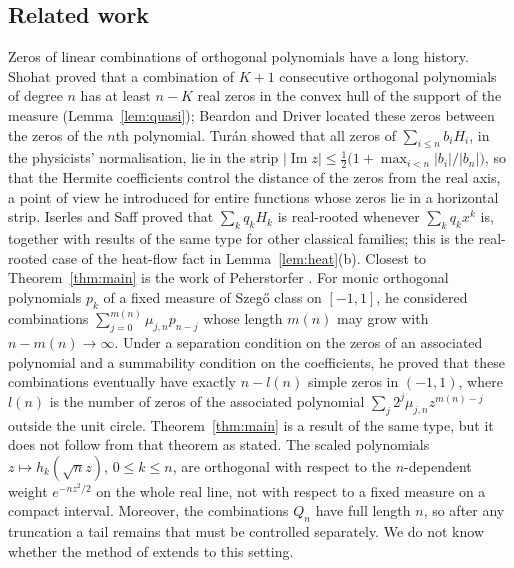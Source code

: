 \documentclass[11pt]{amsart}
\theoremstyle{definition}
\theoremstyle{remark}
\numberwithin{equation}{section}
\DeclareMathOperator{\im}{Im}
\begin{document}
\subsection{Related work}
Zeros of linear combinations of orthogonal polynomials have a long history. Shohat \cite{Sh} proved that a combination of $K+1$ consecutive orthogonal polynomials of degree $n$ has at least $n-K$ real zeros in the convex hull of the support of the measure (Lemma~\ref{lem:quasi}); Beardon and Driver \cite{BD} located these zeros between the zeros of the $n$th polynomial. Tur\'an \cite{Tu} showed that all zeros of $\sum_{i\le n}b_iH_i$, in the physicists' normalisation, lie in the strip $|\im z|\le\frac12\bigl(1+\max_{i<n}|b_i|/|b_n|\bigr)$, so that the Hermite coefficients control the distance of the zeros from the real axis, a point of view he introduced for entire functions whose zeros lie in a horizontal strip. Iserles and Saff \cite{IS} proved that $\sum_kq_kH_k$ is real-rooted whenever $\sum_kq_kx^k$ is, together with results of the same type for other classical families; this is the real-rooted case of the heat-flow fact in Lemma~\ref{lem:heat}(b). Closest to Theorem~\ref{thm:main} is the work of Peherstorfer \cite{Pe}. For monic orthogonal polynomials $p_k$ of a fixed measure of Szeg\H{o} class on $[-1,1]$, he considered combinations $\sum_{j=0}^{m(n)}\mu_{j,n}p_{n-j}$ whose length $m(n)$ may grow with $n-m(n)\to\infty$. Under a separation condition on the zeros of an associated polynomial and a summability condition on the coefficients, he proved that these combinations eventually have exactly $n-l(n)$ simple zeros in $(-1,1)$, where $l(n)$ is the number of zeros of the associated polynomial $\sum_j2^j\mu_{j,n}z^{m(n)-j}$ outside the unit circle. Theorem~\ref{thm:main} is a result of the same type, but it does not follow from that theorem as stated. The scaled polynomials $z\mapsto h_k(\sqrt n z)$, $0\le k\le n$, are orthogonal with respect to the $n$-dependent weight $e^{-nz^2/2}$ on the whole real line, not with respect to a fixed measure on a compact interval. Moreover, the combinations $Q_n$ have full length $n$, so after any truncation a tail remains that must be controlled separately. We do not know whether the method of \cite{Pe} extends to this setting.
\end{document}
